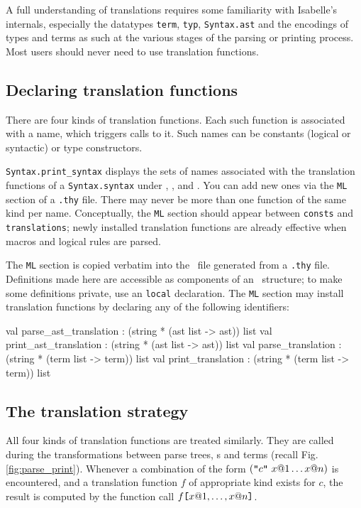 A full understanding of translations requires some familiarity
with Isabelle's internals, especially the datatypes {\tt term}, {\tt typ},
{\tt Syntax.ast} and the encodings of types and terms as such at the various
stages of the parsing or printing process.  Most users should never need to
use translation functions.

\subsection{Declaring translation functions}
There are four kinds of translation functions.  Each such function is
associated with a name, which triggers calls to it.  Such names can be
constants (logical or syntactic) or type constructors.

{\tt Syntax.print_syntax} displays the sets of names associated with the
translation functions of a {\tt Syntax.syntax} under
, ,
 and .  You can
add new ones via the {\tt ML} section of
a {\tt .thy} file.  There may never be more than one function of the same
kind per name.  Conceptually, the {\tt ML} section should appear between
{\tt consts} and {\tt translations}; newly installed translation functions
are already effective when macros and logical rules are parsed.

The {\tt ML} section is copied verbatim into the \ML\ file generated from a
{\tt .thy} file.  Definitions made here are accessible as components of an
\ML\ structure; to make some definitions private, use an \ML{} {\tt local}
declaration.  The {\tt ML} section may install translation functions by
declaring any of the following identifiers:
\begin{ttbox}
val parse_ast_translation : (string * (ast list -> ast)) list
val print_ast_translation : (string * (ast list -> ast)) list
val parse_translation     : (string * (term list -> term)) list
val print_translation     : (string * (term list -> term)) list
\end{ttbox}

\subsection{The translation strategy}
All four kinds of translation functions are treated similarly.  They are
called during the transformations between parse trees, \AST{}s and terms
(recall Fig.\ts\ref{fig:parse_print}).  Whenever a combination of the form
$(\mbox{\tt "}c\mbox{\tt "}~x@1 \ldots x@n)$ is encountered, and a translation function
$f$ of appropriate kind exists for $c$, the result is computed by the \ML{}
function call $f \mbox{\tt [} x@1, \ldots, x@n \mbox{\tt ]}$.

